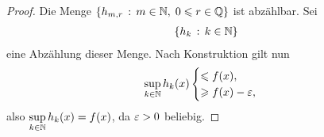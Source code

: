\begin{proof}
Die Menge $\left\{ h_{m,r}\,:\,m\in\mathbb{N},\; 0\leqslant r\in \mathbb{Q}\right\}$ ist abzählbar. Sei
\begin{align*}
\left\{ h_k\,:\,k\in\mathbb{N}\right\}
\end{align*}
eine Abzählung dieser Menge. Nach Konstruktion gilt nun
\begin{align*}
\sup_{k\in\mathbb{N}} h_k(x)
\begin{cases}
\leqslant f(x),\\
\geqslant f(x)-\varepsilon,
\end{cases}
\end{align*}  
also $\sup\limits_{k\in\mathbb{N}} h_k(x) = f(x)$, da $\varepsilon > 0$ beliebig.\qedhere
\end{proof}

% 
% 
% 
% 
% 
% 
% 

